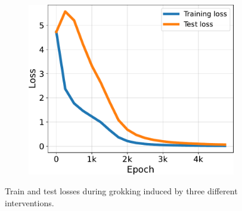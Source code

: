 \begin{figure}[t]
\begin{subfigure}{.33\textwidth}
\end{subfigure}%
\hfill
\begin{subfigure}{.33\textwidth}
  \centering
  \includegraphics[width=\linewidth]{grokking_iclr_arxiv/figures/taylor_loss.pdf}
  \caption{\tsoftmax}
  \label{fig:additional_grokking_taylor}
\end{subfigure}
\vspace{-3mm}
\caption{Train and test losses during grokking induced by three different interventions.\vspace{-2mm}}
\label{fig:additional_grokking}
\end{figure}

